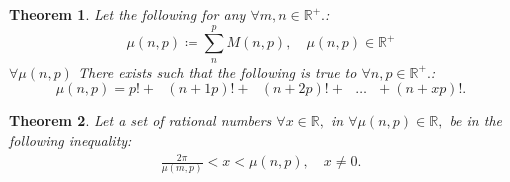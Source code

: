 \documentclass[10pt]{article}
\theoremstyle{plain}
\newtheorem{theorem}{Theorem}[section]
\theoremstyle{definition}
\theoremstyle{remark}
\begin{document}
\begin{theorem}
	Let the following for any $\forall m, n \in \mathbb{R}^{+}.$:
\begin{equation}
    \mu(n, p) \coloneq \sum_{n}^{p} M(n, p), \quad \mu(n, p) \in \mathbb{R}^{+}
\end{equation}
	$\forall \mu(n, p)$ There exists such that the following is true to $\forall n, p \in \mathbb{R}^{+}.$:
\begin{equation}
    \mu(n, p) = p! + \text{ } (n+1p)! + \text{ } (n+2p)! + \text{ } \dots \text{ } + (n+xp)!.
\end{equation}
\end{theorem}

\begin{theorem}
	Let a set of rational numbers $\forall x \in \mathbb{R},$ in $\forall \mu(n, p) \in \mathbb{R},$ be in the following inequality:
	\begin{align*}
		\frac{2\pi}{\mu(m, p)} < x < \mu(n, p), \quad x \neq 0.
	\end{align*}
\end{theorem}
\end{document}
